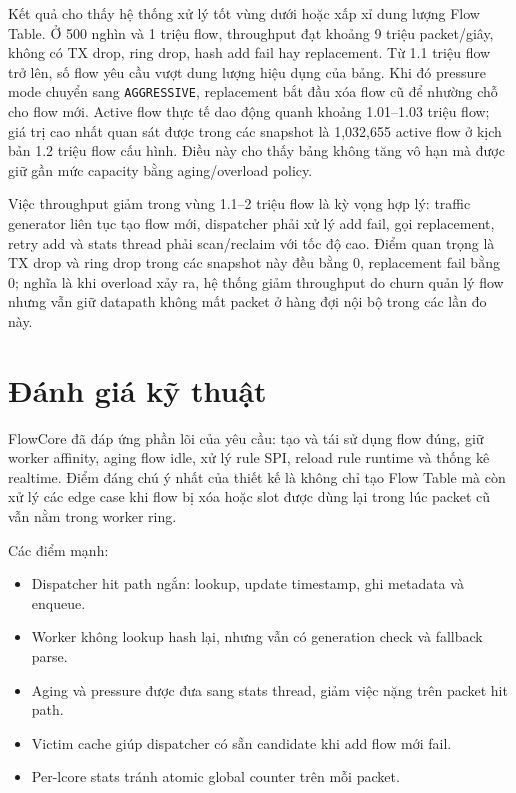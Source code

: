 \documentclass[12pt,a4paper]{report}
\DeclareRobustCommand{\code}[1]{{\small\texttt{#1}}}
\begin{document}
Kết quả cho thấy hệ thống xử lý tốt vùng dưới hoặc xấp xỉ dung lượng Flow Table. Ở 500 nghìn và 1 triệu flow, throughput đạt khoảng 9 triệu packet/giây, không có TX drop, ring drop, hash add fail hay replacement. Từ 1.1 triệu flow trở lên, số flow yêu cầu vượt dung lượng hiệu dụng của bảng. Khi đó pressure mode chuyển sang \code{AGGRESSIVE}, replacement bắt đầu xóa flow cũ để nhường chỗ cho flow mới. Active flow thực tế dao động quanh khoảng 1.01--1.03 triệu flow; giá trị cao nhất quan sát được trong các snapshot là 1,032,655 active flow ở kịch bản 1.2 triệu flow cấu hình. Điều này cho thấy bảng không tăng vô hạn mà được giữ gần mức capacity bằng aging/overload policy.

Việc throughput giảm trong vùng 1.1--2 triệu flow là kỳ vọng hợp lý: traffic generator liên tục tạo flow mới, dispatcher phải xử lý add fail, gọi replacement, retry add và stats thread phải scan/reclaim với tốc độ cao. Điểm quan trọng là TX drop và ring drop trong các snapshot này đều bằng 0, replacement fail bằng 0; nghĩa là khi overload xảy ra, hệ thống giảm throughput do churn quản lý flow nhưng vẫn giữ datapath không mất packet ở hàng đợi nội bộ trong các lần đo này.

\section{Đánh giá kỹ thuật}

FlowCore đã đáp ứng phần lõi của yêu cầu: tạo và tái sử dụng flow đúng, giữ worker affinity, aging flow idle, xử lý rule SPI, reload rule runtime và thống kê realtime. Điểm đáng chú ý nhất của thiết kế là không chỉ tạo Flow Table mà còn xử lý các edge case khi flow bị xóa hoặc slot được dùng lại trong lúc packet cũ vẫn nằm trong worker ring.

Các điểm mạnh:

\begin{itemize}
    \item Dispatcher hit path ngắn: lookup, update timestamp, ghi metadata và enqueue.
    \item Worker không lookup hash lại, nhưng vẫn có generation check và fallback parse.
    \item Aging và pressure được đưa sang stats thread, giảm việc nặng trên packet hit path.
    \item Victim cache giúp dispatcher có sẵn candidate khi add flow mới fail.
    \item Per-lcore stats tránh atomic global counter trên mỗi packet.
\end{itemize}
\end{document}
